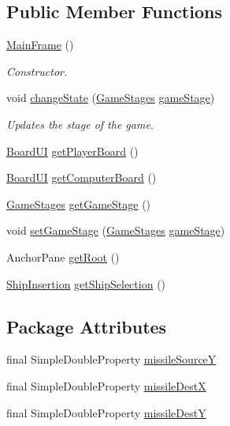 \subsection*{Public Member Functions}
\begin{DoxyCompactItemize}
\item 
\hyperlink{classbattleship2D_1_1ui_1_1MainFrame_ad051e02b396e10caa4738decf20acb11}{Main\-Frame} ()
\begin{DoxyCompactList}\small\item\em Constructor. \end{DoxyCompactList}\item 
void \hyperlink{classbattleship2D_1_1ui_1_1MainFrame_a70c2c2ca18c059eaee9bf6dbad0987af}{change\-State} (\hyperlink{enumbattleship2D_1_1ui_1_1GameStages}{Game\-Stages} \hyperlink{classbattleship2D_1_1ui_1_1MainFrame_a0a2301fb85fa1a17ebcb5e196d441dc0}{game\-Stage})
\begin{DoxyCompactList}\small\item\em Updates the stage of the game. \end{DoxyCompactList}\item 
\hyperlink{classbattleship2D_1_1ui_1_1BoardUI}{Board\-U\-I} \hyperlink{classbattleship2D_1_1ui_1_1MainFrame_a400354ef9f09404e58351089fca63b9a}{get\-Player\-Board} ()
\item 
\hyperlink{classbattleship2D_1_1ui_1_1BoardUI}{Board\-U\-I} \hyperlink{classbattleship2D_1_1ui_1_1MainFrame_a6f9d5aec8efee8827bf8b58f50c5ca76}{get\-Computer\-Board} ()
\item 
\hyperlink{enumbattleship2D_1_1ui_1_1GameStages}{Game\-Stages} \hyperlink{classbattleship2D_1_1ui_1_1MainFrame_a2b96dbc721e68ca6434e3aabeba956dd}{get\-Game\-Stage} ()
\item 
void \hyperlink{classbattleship2D_1_1ui_1_1MainFrame_ad362924d8ec4b1512152db9a1d5705bf}{set\-Game\-Stage} (\hyperlink{enumbattleship2D_1_1ui_1_1GameStages}{Game\-Stages} \hyperlink{classbattleship2D_1_1ui_1_1MainFrame_a0a2301fb85fa1a17ebcb5e196d441dc0}{game\-Stage})
\item 
Anchor\-Pane \hyperlink{classbattleship2D_1_1ui_1_1MainFrame_a5da6e45ca853f0636c6374770a6a3234}{get\-Root} ()
\item 
\hyperlink{classbattleship2D_1_1ui_1_1ShipInsertion}{Ship\-Insertion} \hyperlink{classbattleship2D_1_1ui_1_1MainFrame_a86f2faf5ff3cce4d210577aea00bf4a0}{get\-Ship\-Selection} ()
\end{DoxyCompactItemize}
\subsection*{Package Attributes}
\begin{DoxyCompactItemize}
\item 
final Simple\-Double\-Property \hyperlink{classbattleship2D_1_1ui_1_1MainFrame_ac7e5b51abf3de709693d27b0dc0899e7}{missile\-Source\-Y}
\item 
final Simple\-Double\-Property \hyperlink{classbattleship2D_1_1ui_1_1MainFrame_adcd874489abd642b1ba53db27bb6fa13}{missile\-Dest\-X}
\item 
final Simple\-Double\-Property \hyperlink{classbattleship2D_1_1ui_1_1MainFrame_a5f4019ccf71bb434f200713f25307fff}{missile\-Dest\-Y}
\end{DoxyCompactItemize}
